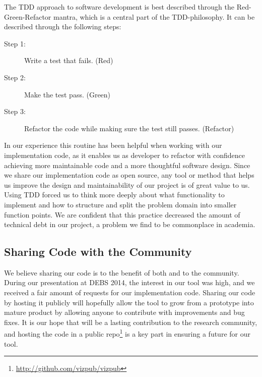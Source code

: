 The TDD approach to software development is best described through the
Red-Green-Refactor mantra, which is a central part of the
TDD-philosophy. It can be described through the following steps:

\begin{description}
    \item[Step 1:] Write a test that fails. (Red)
    \item[Step 2:] Make the test pass. (Green)
    \item[Step 3:] Refactor the code while making sure the test
        still passes. (Refactor)
\end{description}

In our experience this routine has been helpful when working
with our implementation code, as it enables us as developer to
refactor with confidence achieving more maintainable code and a
more thoughtful software design. Since we share our
implementation code as open source, any tool or method that helps us improve the
design and maintainability of our project is of great value to
us. Using TDD forced us to think more deeply about what
functionality to implement and how to structure and split the
problem domain into smaller function points. We are confident that this practice decreased the amount of
technical debt in our project, a problem we find to be commonplace in academia.

\subsection{Sharing Code with the Community}

We believe sharing our code is to the benefit of both \demo{} and to the
community. During our presentation at DEBS 2014, the interest in our
tool was high, and we received a fair amount of requests for our
implementation code. Sharing our code by hosting it publicly will
hopefully allow the tool to grow from a prototype into mature product by
allowing anyone to contribute with improvements and bug fixes. It is our
hope that \demo{} will be a lasting contribution to the research
community, and hosting the code in a public
repo\footnote{\url{http://github.com/vizpub/vizpub}} is a key part in
ensuring a future for our tool.
